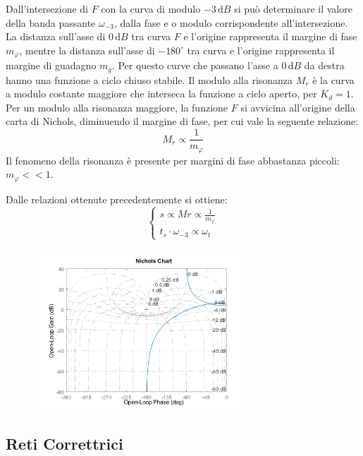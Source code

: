 \documentclass{article}
\numberwithin{equation}{subsection}
\newcommand{\df}{\mathrm{d}}
\begin{document}
Dall'intersezione di $F$ con la curva di modulo $-3\,\df B$ si può determinare il valore della banda passante $\omega_{-3}$, dalla fase e o modulo corrispondente all'intersezione. 
La distanza sull'asse di $0\,\df B$ tra curva $F$ e l'origine rappresenta il margine di fase $m_{\varphi}$, mentre la distanza sull'asse di $-180^{\circ}$ tra curva e l'origine rappresenta il margine di guadagno $m_g$. 
Per questo curve che passano l'asse a $0\,\df B$ da destra hanno una funzione a ciclo chiuso stabile. Il modulo alla 
risonanza $M_r$ è la curva a modulo costante maggiore che interseca la funzione a ciclo aperto, per $K_d=1$. Per un modulo alla risonanza maggiore, la funzione $F$ si avvicina 
all'origine della carta di Nichols, diminuendo il margine di fase, per cui vale la seguente relazione:
\begin{equation*}
    M_r\propto\displaystyle\frac{1}{m_{\varphi}}
\end{equation*}    
Il fenomeno della risonanza è presente per margini di fase abbastanza piccoli: $m_{\varphi}<<1$. 

Dalle relazioni ottenute precedentemente si ottiene: 
\begin{equation}
    \begin{cases}
        s\propto Mr\propto\displaystyle\frac{1}{m_{\varphi}}\\
        t_s\cdot\omega_{-3}\propto\omega_t
    \end{cases}
\end{equation}

\begin{figure}[H]%
    \centering
    \includegraphics[width=8cm]{Nichols1.png}
\end{figure}

\subsection{Reti Correttrici}
\end{document}
